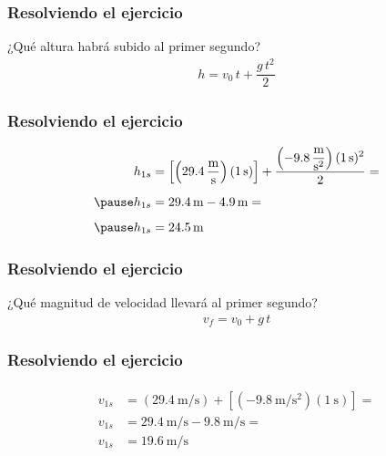 \documentclass[14pt]{beamer}
\begin{document}
\begin{frame}
\frametitle{Resolviendo el ejercicio}
\vspace*{-1cm}
¿Qué altura habrá subido al primer segundo?
\\
\pause
\begin{align*}
h = v_{0} \, t + \dfrac{g \, t^{2}}{2}
\end{align*}
\end{frame}
\begin{frame}
\frametitle{Resolviendo el ejercicio}
\vspace*{-1cm}
\pause
\begin{eqnarray*}
\begin{aligned}
h_{1 s} &= \left[ \left( \SI[per-mode=fraction]{29.4}{\meter\per\second} \right) (\SI{1}{\second}) \right] + \dfrac{\displaystyle \left( - \SI[per-mode=fraction]{9.8}{\meter\per\square\second} \right)(\SI{1}{\second})^{2}}{2} = \\[0.5em] \pause
h_{1 s} &= \SI[per-mode=fraction]{29.4}{\meter} - \SI[per-mode=fraction]{4.9}{\meter} =  \\[0.5em] \pause
h_{1 s} &= \SI[per-mode=fraction]{24.5}{\meter}
\end{aligned}
\end{eqnarray*}
\end{frame}
\begin{frame}
\frametitle{Resolviendo el ejercicio}
\vspace*{-1cm}
¿Qué magnitud de velocidad llevará al primer segundo?
\\
\pause
\begin{align*}
v_{f} = v_{0} + g \, t
\end{align*}
\end{frame}
\begin{frame}
\frametitle{Resolviendo el ejercicio}
\vspace*{-1cm}
\pause
\begin{eqnarray*}
\begin{aligned}
v_{1 s} &= \left( \SI[per-mode=fraction]{29.4}{\meter\per\second}\right) + \left[ \displaystyle \left( - \SI[per-mode=fraction]{9.8}{\meter\per\square\second} \right) (\SI{1}{\second}) \right] = \\[0.5em] 
v_{1 s} &= \SI[per-mode=fraction]{29.4}{\meter\per\second} - \SI[per-mode=fraction]{9.8}{\meter\per\second} = \\[0.5em]
v_{1 s} &= \SI[per-mode=fraction]{19.6}{\meter\per\second}
\end{aligned}
\end{eqnarray*}
\end{frame} 
\end{document}

